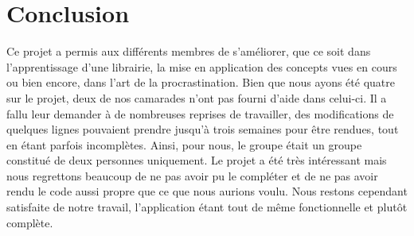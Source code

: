 \chapter{Conclusion}

	Ce projet a permis aux différents membres de s'améliorer, que ce soit dans l'apprentissage d'une librairie, la mise en application des concepts vues en cours ou bien encore, dans l'art de la procrastination. Bien que nous ayons été quatre sur le projet, deux de nos camarades n'ont pas fourni d'aide dans celui-ci. Il a fallu leur demander à de nombreuses reprises de travailler, des modifications de quelques lignes pouvaient prendre jusqu'à trois semaines pour être rendues, tout en étant parfois incomplètes. Ainsi, pour nous, le groupe était un groupe constitué de deux personnes uniquement. Le projet a été très intéressant mais nous regrettons beaucoup de ne pas avoir pu le compléter et de ne pas avoir rendu le code aussi propre que ce que nous aurions voulu. Nous restons cependant satisfaite de notre travail, l'application étant tout de même fonctionnelle et plutôt complète.

